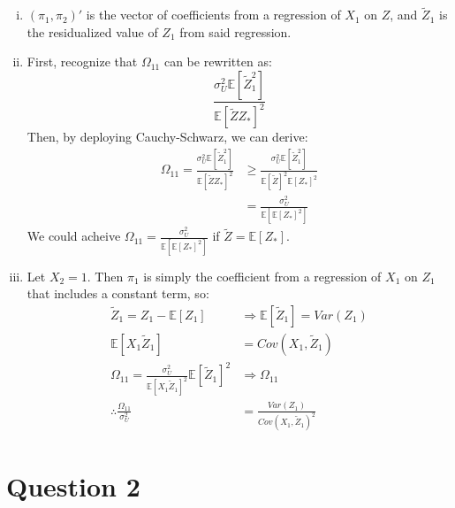 \documentclass{article}
\renewcommand{\tilde}[1]{\widetilde{#1}}
\newcommand{\E}[1]{\mathbb{E}\left[#1\right]}%
\begin{document}
\begin{enumerate}[(i)]
	\item $(\pi_1,\pi_2)'$ is the vector of coefficients from a regression of $X_1$ on $Z$, and $\tilde{Z}_1$ is the residualized value of $Z_1$ from said regression.
	
	\item First, recognize that $\Omega_{11}$ can be rewritten as:
		\[
			\frac{\sigma^2_U\E{\tilde{Z}_1^2}}{\E{\tilde{Z}Z_*}^2}
		\]
		Then, by deploying Cauchy-Schwarz, we can derive:
		\begin{align*}
			\Omega_{11} = 
			\frac{\sigma^2_U\E{\tilde{Z}_1^2}}{\E{\tilde{Z}Z_*}^2} 	&\geq 	\frac{\sigma^2_U\E{\tilde{Z}_1^2}}{\E{\tilde{Z}}^2\E{Z_*}^2}	\\
																	&= 		 \frac{\sigma^2_U}{\E{\E{Z_*}^2}}
		\end{align*}
		We could acheive ${\Omega_{11} = \frac{\sigma^2_U}{\E{\E{Z_*}^2}}}$ if ${\tilde{Z}=\E{Z_*}}$.
		
	\item Let $X_2=1$. Then $\pi_1$ is simply the coefficient from a regression of $X_1$ on $Z_1$ that includes a constant term, so:
		\begin{align*}
													\tilde{Z}_1 = Z_1 - \E{Z_1}		&\Rightarrow \E{\tilde{Z}_1} = Var(Z_1)	\\
																\E{X_1\tilde{Z}_1} 	&= Cov(X_1,\tilde{Z}_1)					\\
			\Omega_{11} = \frac{\sigma_U^2}{\E{X_1\tilde{Z}_1}^2}\E{\tilde{Z}_1}^2 	&\Rightarrow 
				\Omega_{11}											\\
				\therefore \frac{\Omega_{11}}{\sigma_U^2} 							&= \frac{Var(Z_1)}{Cov(X_1,\tilde{Z}_1)^2}	
		\end{align*}
	
\end{enumerate}



\section*{Question 2}
\end{document}
